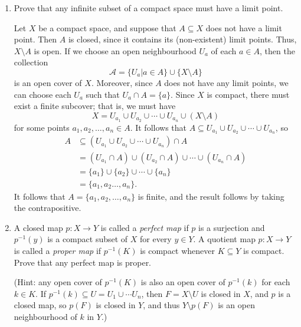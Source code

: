 \documentclass[letterpaper,12pt]{article}
\begin{document}
\begin{enumerate}
\begin{enumerate}
\bigskip

\end{enumerate}
\item Prove that any infinite subset of a compact space must have  a limit point.

\bigskip

Let $X$ be a compact space, and suppose that $A\subseteq X$ does not have a limit point. Then $A$ is closed, since it contains its (non-existent) limit points. Thus, $X\setminus A$ is open. If we choose an open neighbourhood $U_a$ of each $a\in A$, then the collection
\[
\mathcal{A} = \{U_a | a\in A\}\cup\{X\setminus A\}
\]
is an open cover of $X$. Moreover, since $A$ does not have any limit points, we can choose each $U_a$ such that $U_a\cap A = \{a\}$. Since $X$ is compact, there must exist a finite subcover; that is, we must have 
\[
X = U_{a_1}\cup U_{a_2}\cup\cdots \cup U_{a_n}\cup (X\setminus A)
\]
for some points $a_1,a_2,\ldots, a_n\in A$. It follows that $A \subseteq U_{a_1}\cup U_{a_2}\cup \cdots \cup U_{a_n}$, so
\begin{align*}
A & \subseteq (U_{a_1}\cup U_{a_2}\cup \cdots \cup U_{a_n})\cap A\\
& = (U_{a_1}\cap A)\cup (U_{a_2}\cap A)\cup \cdots \cup (U_{a_n}\cap A)\\
& = \{a_1\}\cup\{a_2\}\cup\cdots\cup\{a_n\}\\
& = \{a_1,a_2\ldots, a_n\}.
\end{align*}
It follows that $A=\{a_1,a_2,\ldots, a_n\}$ is finite, and the result follows by taking the contrapositive.

\bigskip

\item A closed map $p:X\to Y$ is called a {\em perfect map} if $p$ is a surjection and $p^{-1}(y)$ is a compact subset of $X$ for every $y\in Y$. A quotient map $p:X\to Y$ is called a {\em proper map} if $p^{-1}(K)$ is compact whenever $K\subseteq Y$ is compact. Prove that any perfect map is proper.

(Hint: any open cover of $p^{-1}(K)$ is also an open cover of $p^{-1}(k)$ for each $k\in K$. If $p^{-1}(k)\subseteq U=U_1\cup\cdots U_n$, then $F=X\setminus U$ is closed in $X$, and $p$ is a closed map, so $p(F)$ is closed in $Y$, and thus $Y\setminus p(F)$ is an open neighbourhood of $k$ in $Y$.)

\bigskip


\end{enumerate}
\end{document}

